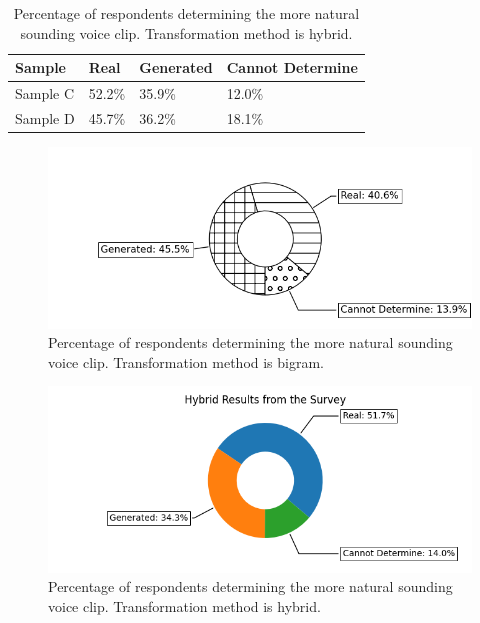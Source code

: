 \documentclass[journal]{IEEEtran}
\begin{document}
\begin{table}
\caption{Percentage of respondents determining the more natural sounding voice clip. Transformation method is hybrid.}
\label{tab3}
\small
\setlength{\tabcolsep}{3pt}
\begin{tabular}{|p{58pt}|p{58pt}|p{58pt}|p{58pt}|}
\hline
Sample& 
Real& 
Generated&
Cannot Determine \\
\hline
Sample C & 52.2\% & 35.9\% & 12.0\% \\
Sample D & 45.7\% & 36.2\% & 18.1\% \\ 
\hline
\end{tabular}
\label{tab3}
\end{table}

\begin{figure}
\centerline{\includegraphics[width=\columnwidth]{bigram.png}}
\caption{Percentage of respondents determining the more natural sounding voice clip. Transformation method is bigram.}
\label{fig1}
\end{figure}

\begin{figure}
\centerline{\includegraphics[width=\columnwidth]{hybrid.png}}
\caption{Percentage of respondents determining the more natural sounding voice clip. Transformation method is hybrid.}
\label{fig2}
\end{figure}
\end{document}
